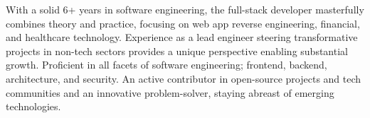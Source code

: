 

\begin{cvparagraph}

With a solid 6+ years in software engineering, the full-stack developer masterfully combines theory and practice, focusing on web app reverse engineering, financial, and healthcare technology. Experience as a lead engineer steering transformative projects in non-tech sectors provides a unique perspective enabling substantial growth. Proficient in all facets of software engineering; frontend, backend, architecture, and security. An active contributor in open-source projects and tech communities and an innovative problem-solver, staying abreast of emerging technologies.
\end{cvparagraph}
